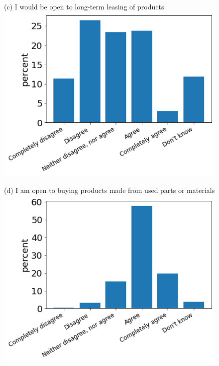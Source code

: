 \documentclass[12pt]{article}
\begin{document}
\begin{figure}[h!!]
\begin{minipage}[h!!]{0.32\textwidth}
	\end{minipage}
	\begin{minipage}[h!!]{0.32\textwidth}  
		\centering\footnotesize{(c) I would be open to long-term leasing of products}
		\includegraphics[width=1\textwidth]{../codding_data/results/liss/qk20a141title0.png}
	\end{minipage}	
	\begin{minipage}[h!!]{0.32\textwidth}  
	\centering\footnotesize{(d) I am open to buying products made from used parts or materials}
	\includegraphics[width=1\textwidth]{../codding_data/results/liss/qk20a147title0.png}

\end{minipage}
\end{figure}
\end{document}
